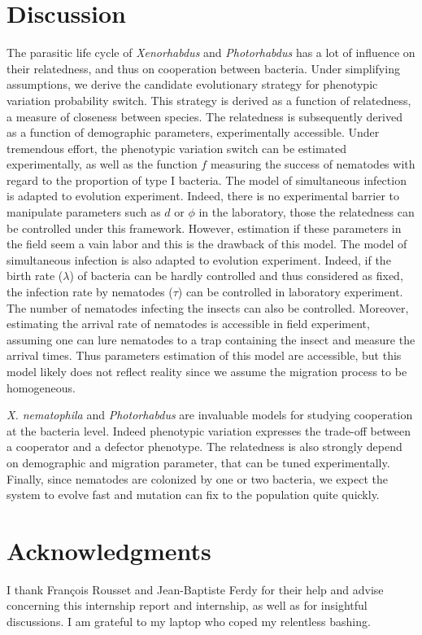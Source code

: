 \documentclass[10pt]{article}
\newcommand{\Xnema}{\textit{X. nematophila} }
\newcommand{\Xeno}{\textit{Xenorhabdus} }
\newcommand{\Photo}{\textit{Photorhabdus} }
\begin{document}
\begin{multicols}{2}
\section*{Discussion}
The parasitic life cycle of \Xeno and \Photo has a lot of influence on their relatedness, and thus on cooperation between bacteria. 
Under simplifying assumptions, we derive the candidate evolutionary strategy for phenotypic variation probability switch. 
This strategy is derived as a function of relatedness, a measure of closeness between species.  
The relatedness is subsequently derived as a function of demographic parameters, experimentally accessible.
Under tremendous effort, the phenotypic variation switch can be estimated experimentally, as well as the function $f$ measuring the success of nematodes with regard to the proportion of type I bacteria.
The model of simultaneous infection is adapted to evolution experiment. 
Indeed, there is no experimental barrier to manipulate parameters such as $d$ or $\phi$ in the laboratory, those the relatedness can be controlled under this framework. 
However, estimation if these parameters in the field seem a vain labor and this is the drawback of this model. 
The model of simultaneous infection is also adapted to evolution experiment. 
Indeed, if the birth rate ($\lambda$) of bacteria can be hardly controlled and thus considered as fixed, the infection rate by nematodes ($\tau$) can be controlled in laboratory experiment. 
The number of nematodes infecting the insects can also be controlled. 
Moreover, estimating the arrival rate of nematodes is accessible in field experiment, assuming one can lure nematodes to a trap containing the insect and measure the arrival times. 
Thus parameters estimation of this model are accessible, but this model likely does not reflect reality since we assume the migration process to be homogeneous. 

\Xnema and \Photo are invaluable models for studying cooperation at the bacteria level. 
Indeed phenotypic variation expresses the trade-off between a cooperator and a defector phenotype. 
The relatedness is also strongly depend on demographic and migration parameter, that can be tuned experimentally.
Finally, since nematodes are colonized by one or two bacteria, we expect the system to evolve fast and mutation can fix to the population quite quickly.
\section*{Acknowledgments}
I thank François Rousset and Jean-Baptiste Ferdy for their help and advise concerning this internship report and internship, as well as for insightful discussions. 
I am grateful to my laptop who coped my relentless bashing.


\end{multicols}
\end{document}
